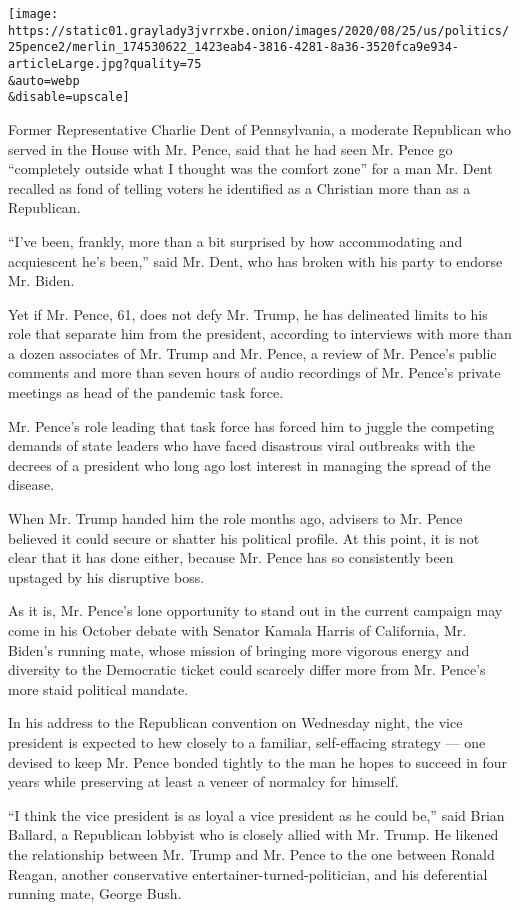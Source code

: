 \texttt{[image: https://static01.graylady3jvrrxbe.onion/images/2020/08/25/us/politics/25pence2/merlin\_174530622\_1423eab4-3816-4281-8a36-3520fca9e934-articleLarge.jpg?quality=75\\\&auto=webp\\\&disable=upscale]}

Former Representative Charlie Dent of Pennsylvania, a moderate
Republican who served in the House with Mr. Pence, said that he had seen
Mr. Pence go ``completely outside what I thought was the comfort zone''
for a man Mr. Dent recalled as fond of telling voters he identified as a
Christian more than as a Republican.

``I've been, frankly, more than a bit surprised by how accommodating and
acquiescent he's been,'' said Mr. Dent, who has broken with his party to
endorse Mr. Biden.

Yet if Mr. Pence, 61, does not defy Mr. Trump, he has delineated limits
to his role that separate him from the president, according to
interviews with more than a dozen associates of Mr. Trump and Mr. Pence,
a review of Mr. Pence's public comments and more than seven hours of
audio recordings of Mr. Pence's private meetings as head of the pandemic
task force.

Mr. Pence's role leading that task force has forced him to juggle the
competing demands of state leaders who have faced disastrous viral
outbreaks with the decrees of a president who long ago lost interest in
managing the spread of the disease.

When Mr. Trump handed him the role months ago, advisers to Mr. Pence
believed it could secure or shatter his political profile. At this
point, it is not clear that it has done either, because Mr. Pence has so
consistently been upstaged by his disruptive boss.

As it is, Mr. Pence's lone opportunity to stand out in the current
campaign may come in his October debate with Senator Kamala Harris of
California, Mr. Biden's running mate, whose mission of bringing more
vigorous energy and diversity to the Democratic ticket could scarcely
differ more from Mr. Pence's more staid political mandate.

In his address to the Republican convention on Wednesday night, the vice
president is expected to hew closely to a familiar, self-effacing
strategy --- one devised to keep Mr. Pence bonded tightly to the man he
hopes to succeed in four years while preserving at least a veneer of
normalcy for himself.

``I think the vice president is as loyal a vice president as he could
be,'' said Brian Ballard, a Republican lobbyist who is closely allied
with Mr. Trump. He likened the relationship between Mr. Trump and Mr.
Pence to the one between Ronald Reagan, another conservative
entertainer-turned-politician, and his deferential running mate, George
Bush.

